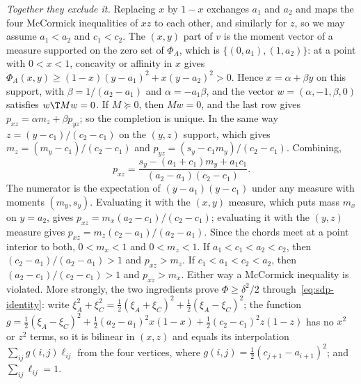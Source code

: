 \emph{Together they exclude it.} Replacing $x$ by $1-x$ exchanges $a_1$ and $a_2$
and maps the four McCormick inequalities of $xz$ to each other, and similarly
for $z$, so we may assume $a_1<a_2$ and $c_1<c_2$. The $(x,y)$ part of $v$ is
the moment vector of a measure supported on the zero set of $\Phi_A$, which is
$\{(0,a_1),(1,a_2)\}$: at a point with $0<x<1$, concavity or affinity in $x$
gives $\Phi_A(x,y)\ge(1-x)(y-a_1)^2+x(y-a_2)^2>0$. Hence $x=\alpha+\beta y$ on this
support, with $\beta=1/(a_2-a_1)$ and $\alpha=-a_1\beta$, and the vector
$w=(\alpha,-1,\beta,0)$ satisfies $w\T Mw=0$. If $M\succeq0$, then $Mw=0$, and the
last row gives $p_{xz}=\alpha m_z+\beta p_{yz}$; so the completion is unique. In
the same way $z=(y-c_1)/(c_2-c_1)$ on the $(y,z)$ support, which gives
$m_z=(m_y-c_1)/(c_2-c_1)$ and $p_{yz}=(s_y-c_1m_y)/(c_2-c_1)$. Combining,
\[
p_{xz}=\frac{s_y-(a_1+c_1)m_y+a_1c_1}{(a_2-a_1)(c_2-c_1)}.
\]
The numerator is the expectation of $(y-a_1)(y-c_1)$ under any measure with
moments $(m_y,s_y)$. Evaluating it with the $(x,y)$ measure, which puts mass
$m_x$ on $y=a_2$, gives $p_{xz}=m_x(a_2-c_1)/(c_2-c_1)$; evaluating it with the
$(y,z)$ measure gives $p_{xz}=m_z(c_2-a_1)/(a_2-a_1)$. Since the chords meet at
a point interior to both, $0<m_x<1$ and $0<m_z<1$. If $a_1<c_1<a_2<c_2$, then
$(c_2-a_1)/(a_2-a_1)>1$ and $p_{xz}>m_z$. If $c_1<a_1<c_2<a_2$, then
$(a_2-c_1)/(c_2-c_1)>1$ and $p_{xz}>m_x$. Either way a McCormick inequality is
violated. More strongly, the two ingredients prove $\Phi\ge\delta^2/2$
through~\eqref{eq:sdp-identity}: write
$\xi_A^2+\xi_C^2=\tfrac12(\xi_A+\xi_C)^2+\tfrac12(\xi_A-\xi_C)^2$; the function
$g=\tfrac12(\xi_A-\xi_C)^2+\tfrac12(a_2-a_1)^2x(1-x)+\tfrac12(c_2-c_1)^2z(1-z)$ has no
$x^2$ or $z^2$ terms, so it is bilinear in $(x,z)$ and equals its interpolation
$\sum_{ij}g(i,j)\ell_{ij}$ from the four vertices, where
$g(i,j)=\tfrac12(c_{j+1}-a_{i+1})^2$; and $\sum_{ij}\ell_{ij}=1$.
